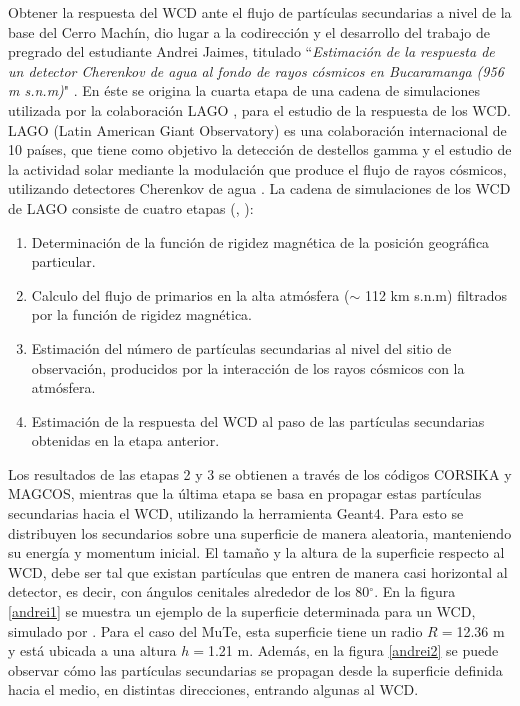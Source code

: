 \documentclass[12pt,oneside,openany,letter]{book}
\begin{document}
Obtener la respuesta del WCD ante el flujo de partículas secundarias a nivel de la base del Cerro Machín, dio lugar a la codirecci\'on y el desarrollo del trabajo de pregrado del estudiante Andrei Jaimes, titulado ``\textit{Estimaci\'on de la respuesta de un detector Cherenkov de agua al fondo de rayos c\'osmicos en Bucaramanga (956 m s.n.m)}" \cite{JaimesMotta2018}. En \'este se origina la cuarta etapa de una cadena de simulaciones utilizada por la colaboraci\'on LAGO \cite{calderon2015geant4}, para el estudio de la respuesta de los WCD. LAGO (Latin American Giant Observatory) es una colaboraci\'on internacional de 10 pa\'ises, que tiene como objetivo la detecci\'on de destellos gamma y el estudio de la actividad solar mediante la modulaci\'on que produce el flujo de rayos c\'osmicos, utilizando detectores Cherenkov de agua \cite{LAGO2009}. La cadena de simulaciones de los WCD de LAGO consiste de cuatro etapas (\cite{JaimesMotta2018}, \cite{asorey2018preliminary}):
\begin{enumerate}
\item Determinaci\'on de la funci\'on de rigidez magn\'etica de la posici\'on geogr\'afica particular.
\item Calculo del flujo de primarios en la alta atm\'osfera ($\sim$ 112 km s.n.m) filtrados por la funci\'on de rigidez magn\'etica.
\item Estimaci\'on del n\'umero de part\'iculas secundarias al nivel del sitio de observaci\'on, producidos por la interacci\'on de los rayos c\'osmicos con la atm\'osfera.
\item Estimaci\'on de la respuesta del WCD al paso de las part\'iculas secundarias obtenidas en la etapa anterior.
\end{enumerate}
Los resultados de las etapas 2 y 3 se obtienen a trav\'es de los c\'odigos CORSIKA y MAGCOS, mientras que la \'ultima etapa se basa en propagar estas part\'iculas secundarias hacia el WCD, utilizando la herramienta Geant4. Para esto se distribuyen los secundarios sobre una superficie de manera aleatoria, manteniendo su energ\'ia y momentum inicial. El tama\~no y la altura de la superficie respecto al WCD, debe ser tal que existan part\'iculas que entren de manera casi horizontal al detector, es decir, con \'angulos cenitales alrededor de los 80$^{\circ}$. En la figura \ref{andrei1} se muestra un ejemplo de la superficie determinada para un WCD, simulado por \cite{JaimesMotta2018}. Para el caso del MuTe, esta superficie tiene un radio $R=$12.36 m y est\'a ubicada a una altura $h=$1.21 m. Adem\'as, en la figura \ref{andrei2} se puede observar c\'omo las part\'iculas secundarias se propagan desde la superficie definida hacia el medio, en distintas direcciones, entrando algunas al WCD.
\end{document}
